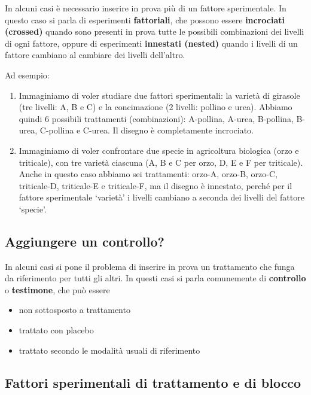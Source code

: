 \documentclass[a4paper,12pt,oneside]{book}
\providecommand{\tightlist}{%
  \setlength{\itemsep}{0pt}\setlength{\parskip}{0pt}}
\begin{document}
In alcuni casi è necessario inserire in prova più di un fattore
sperimentale. In questo caso si parla di esperimenti
\textbf{fattoriali}, che possono essere \textbf{incrociati (crossed)}
quando sono presenti in prova tutte le possibili combinazioni dei
livelli di ogni fattore, oppure di esperimenti \textbf{innestati
(nested)} quando i livelli di un fattore cambiano al cambiare dei
livelli dell'altro.

Ad esempio:

\begin{enumerate}
\def\labelenumi{\arabic{enumi}.}
\tightlist
\item
  Immaginiamo di voler studiare due fattori sperimentali: la varietà di
  girasole (tre livelli: A, B e C) e la concimazione (2 livelli: pollino
  e urea). Abbiamo quindi 6 possibili trattamenti (combinazioni):
  A-pollina, A-urea, B-pollina, B-urea, C-pollina e C-urea. Il disegno è
  completamente incrociato.
\item
  Immaginiamo di voler confrontare due specie in agricoltura biologica
  (orzo e triticale), con tre varietà ciascuna (A, B e C per orzo, D, E
  e F per triticale). Anche in questo caso abbiamo sei trattamenti:
  orzo-A, orzo-B, orzo-C, triticale-D, triticale-E e triticale-F, ma il
  disegno è innestato, perché per il fattore sperimentale `varietà' i
  livelli cambiano a seconda dei livelli del fattore `specie'.
\end{enumerate}

\subsection{Aggiungere un controllo?}\label{aggiungere-un-controllo}

In alcuni casi si pone il problema di inserire in prova un trattamento
che funga da riferimento per tutti gli altri. In questi casi si parla
comunemente di \textbf{controllo} o \textbf{testimone}, che può essere

\begin{itemize}
\tightlist
\item
  non sottosposto a trattamento
\item
  trattato con placebo
\item
  trattato secondo le modalità usuali di riferimento
\end{itemize}

\subsection{Fattori sperimentali di trattamento e di
blocco}\label{fattori-sperimentali-di-trattamento-e-di-blocco}
\end{document}
